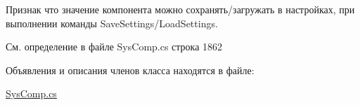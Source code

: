 Признак что значение компонента можно сохранять/загружать в настройках, при выполнении команды Save\+Settings/\+Load\+Settings. ~\newline




См. определение в файле Sys\+Comp.\+cs строка 1862



Объявления и описания членов класса находятся в файле\+:\begin{DoxyCompactItemize}
\item 
\mbox{\hyperlink{_sys_comp_8cs}{Sys\+Comp.\+cs}}\end{DoxyCompactItemize}
